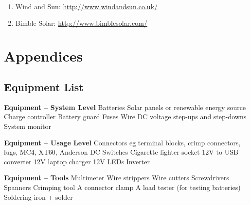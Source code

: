 \documentclass{article}
\theoremstyle{definition}
\theoremstyle{definition}
\theoremstyle{remark}
\begin{document}
    \begin{enumerate}[resume]
      \item Wind and Sun: \href{http://www.windandsun.co.uk/}{\underline{http://www.windandsun.co.uk/}}
      \item Bimble Solar: \href{http://www.bimblesolar.com/}{\underline{http://www.bimblesolar.com/}}
    \end{enumerate}
  


{\color{blue}\section{Appendices}} %
\label{sec:appendices}

  {\color{blue}\subsection{Equipment List}} %
  \label{sub:equipment_list}

    \textbf{Equipment – System Level} \newline
    Batteries \newline
    Solar panels or renewable energy source \newline
    Charge controller \newline
    Battery guard \newline
    Fuses \newline
    Wire \newline
    DC voltage step-ups and step-downs \newline
    System monitor

    \textbf{Equipment – Usage Level} \newline
    Connectors eg terminal blocks, crimp \newline
    connectors, lugs, MC4, XT60, Anderson \newline
    DC Switches \newline
    Cigarette lighter socket \newline
    12V to USB converter \newline
    12V laptop charger \newline
    12V LEDs \newline
    Inverter

    \textbf{Equipment – Tools} \newline
    Multimeter \newline
    Wire strippers \newline
    Wire cutters \newline
    Screwdrivers \newline
    Spanners \newline
    Crimping tool \newline
    A connector clamp \newline
    A load tester (for testing batteries) \newline
    Soldering iron + solder
      
\end{document}
